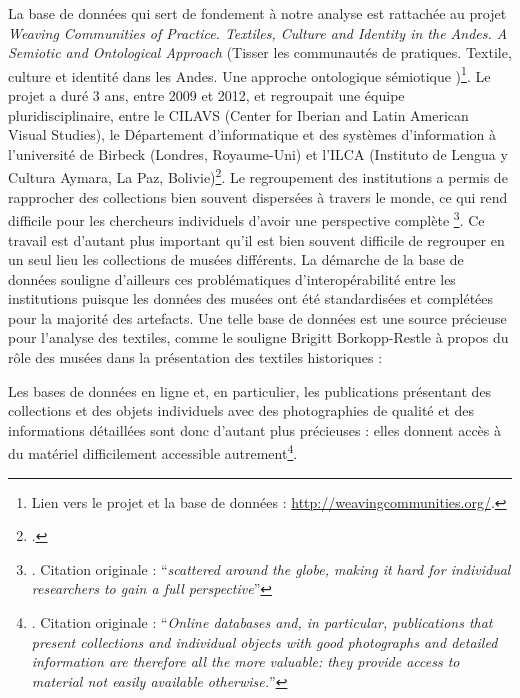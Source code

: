 La base de données qui sert de fondement à notre analyse est rattachée au projet \textit{Weaving Communities of Practice. Textiles, Culture and Identity in the Andes. A Semiotic and Ontological Approach} (\og Tisser les communautés de pratiques. Textile, culture et identité dans les Andes. Une approche ontologique sémiotique \fg)\footnote{Lien vers le projet et la base de données : \url{http://weavingcommunities.org/}.}. Le projet a duré 3 ans, entre 2009 et 2012, et regroupait une équipe pluridisciplinaire, entre le CILAVS (Center for Iberian and Latin American Visual Studies), le Département d'informatique et des systèmes d'information à l'université de Birbeck (Londres, Royaume-Uni) et l'ILCA (Instituto de Lengua y Cultura Aymara, La Paz, Bolivie)\footcite{martinsExploringWeavingStructures2013}. Le regroupement des institutions a permis de rapprocher des collections bien souvent \og dispersées à travers le monde, ce qui rend difficile pour les chercheurs individuels d'avoir une perspective complète \fg\footnote{\cite[p.~3]{brownlowOntologicalApproachCreating2015}. Citation originale : \textquotedblleft \textit{scattered around the globe, making it hard for individual researchers to gain a full perspective}\textquotedblright}. Ce travail est d'autant plus important qu'il est bien souvent difficile de regrouper en un seul lieu les collections de musées différents. La démarche de la base de données souligne d'ailleurs ces problématiques d'interopérabilité entre les institutions puisque les données des musées ont été standardisées et complétées pour la majorité des artefacts. Une telle base de données est une source précieuse pour l'analyse des textiles, comme le souligne Brigitt Borkopp-Restle à propos du rôle des musées dans la présentation des textiles historiques : 
\begin{citer}
Les bases de données en ligne et, en particulier, les publications présentant des collections et des objets individuels avec des photographies de qualité et des informations détaillées sont donc d'autant plus précieuses : elles donnent accès à du matériel difficilement accessible autrement\footnote{\cite[p.~47]{borkopp-restleMuseumsMakingTextile2016}. Citation originale : \textquotedblleft \textit{Online databases and, in particular, publications that present collections and individual objects with good photographs and detailed information are therefore all the more valuable: they provide access to material not easily available otherwise.}\textquotedblright}.
\end{citer}

